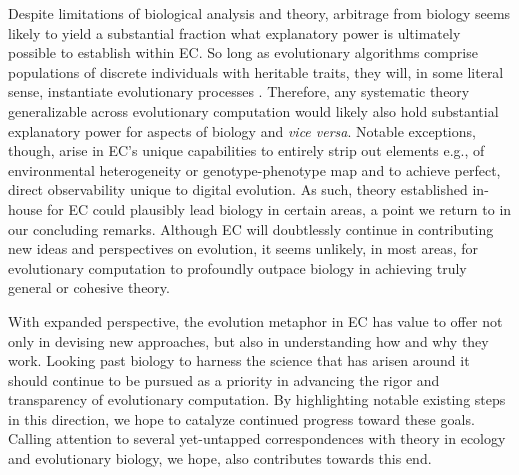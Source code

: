 Despite limitations of biological analysis and theory, arbitrage from biology seems likely to yield a substantial fraction what explanatory power is ultimately possible to establish within EC.
So long as evolutionary algorithms comprise populations of discrete individuals with heritable traits, they will, in some literal sense, instantiate evolutionary processes \citep{pennock2007models}.
Therefore, any systematic theory generalizable across evolutionary computation would likely also hold substantial explanatory power for aspects of biology and \textit{vice versa}.
Notable exceptions, though, arise in EC's unique capabilities to entirely strip out elements e.g., of environmental heterogeneity or genotype-phenotype map and to achieve perfect, direct observability unique to digital evolution.
As such, theory established in-house for EC could plausibly lead biology in certain areas, a point we return to in our concluding remarks.
Although EC will doubtlessly continue in contributing new ideas and perspectives on evolution, it seems unlikely, in most areas, for evolutionary computation to profoundly outpace biology in achieving truly general or cohesive theory.

With expanded perspective, the evolution metaphor in EC has value to offer not only in devising new approaches, but also in understanding how and why they work.
Looking past biology to harness the science that has arisen around it should continue to be pursued as a priority in advancing the rigor and transparency of evolutionary computation.
By highlighting notable existing steps in this direction, we hope to catalyze continued progress toward these goals.
Calling attention to several yet-untapped correspondences with theory in ecology and evolutionary biology, we hope, also contributes towards this end.
